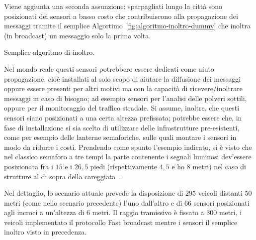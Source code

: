 Viene aggiunta una seconda assunzione: sparpagliati lungo la città sono posizionati dei sensori a basso costo
che contribuiscono alla propagazione dei messaggi tramite il semplice Algortimo~\ref{fig:algoritmo-inoltro-dummy}
che inoltra (in broadcast) un messaggio solo la prima volta.
%
\begin{italianalgorithm}[h]
\begin{algorithmic}[1]
		\EndIf{}
\end{algorithmic}
\caption{Semplice algoritmo di inoltro.}\label{fig:algoritmo-inoltro-dummy}
\end{italianalgorithm}
%
Nel mondo reale questi sensori potrebbero essere dedicati come aiuto propagazione,
cioè installati al solo scopo di aiutare la diffusione dei messaggi
oppure essere presenti per altri motivi ma con la capacità di ricevere/inoltrare messaggi
in caso di bisogno; ad esempio sensori per l'analisi delle polveri sottili,
oppure per il monitoraggio del traffico stradale.
Si assume, inoltre, che questi sensori siano posizionati a una certa altezza prefissata;
potrebbe essere che, in fase di installazione si sia scelto di utilizzare delle infrastrutture
pre-esistenti, come per esempio delle lanterne semaforiche, sulle quali montare i sensori in modo da ridurre i costi.
Prendendo come spunto l'esempio indicato, si è visto che nel classico semaforo a tre tempi
la parte contenente i segnali luminosi dev'essere posizionata
fra i $15$ e i $26,5$ piedi (rispettivamente $4,5$ e ho $8$ metri) nel caso di strutture al di sopra della
careggiata~\cite{MUTCD}.

Nel dettaglio, lo scenario attuale prevede la disposizione di $295$ veicoli distanti
$50$ metri (come nello scenario precedente) l'uno dall'altro
e di $66$ sensori posizionati agli incroci a un'altezza di $6$ metri.
Il raggio tramissivo è fissato a $300$ metri, i veicoli implementato il protocollo Fast broadcast
mentre i sensori il semplice inoltro visto in precedenza.

